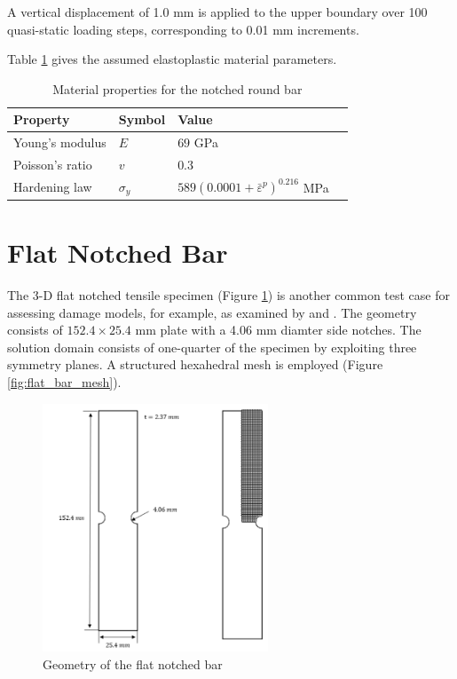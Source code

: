 \documentclass[sn-mathphys,Numbered,draft]{sn-jnl}%
\begin{document}
A vertical displacement of 1.0 \si{\milli\meter} is applied to the upper boundary over 100 quasi-static loading steps, corresponding to 0.01 \si{\milli\meter} increments.

Table \ref{tab:notched_bar_mat} gives the assumed elastoplastic material parameters.
\begin{table}[htb]
	\centering
		\begin{tabular}{llll} \hline
			Property & Symbol & Value  \\ \hline 
			Young's modulus & $E$ & $69$ GPa \\
			Poisson's ratio & $v$ & $0.3$   \\
			Hardening law & $\sigma_y$ & $589({0.0001+\bar{\varepsilon}}^p)^{0.216}$ MPa  \\
			\hline
		\end{tabular}
	\caption{Material properties for the notched round bar}
	\label{tab:notched_bar_mat}
\end{table}



\section{Flat Notched Bar}
The 3-D flat notched tensile specimen (Figure \ref{fig:flat_bar_geom}) is another common test case for assessing damage models, for example, as examined by \citet{borden_phase-field_2016} and \citet{eldahshan_phase_2021}.
The geometry consists of $152.4 \times 25.4$ \si{\milli\meter} plate with a 4.06 \si{\milli\meter} diamter side notches.
The solution domain consists of one-quarter of the specimen by exploiting three symmetry planes.
A structured hexahedral mesh is employed (Figure \ref{fig:flat_bar_mesh}).

\begin{figure}[htb] \label{fig:flat_bar_geom}
\begin{center}
	\includegraphics[width=0.6\textwidth]{./Figures/finiteVolumeImplementation/inhomogenousDeformation/flatNotchedTensile.png}
\caption{Geometry of the flat notched bar}
\end{center}
\end{figure}
\end{document}
